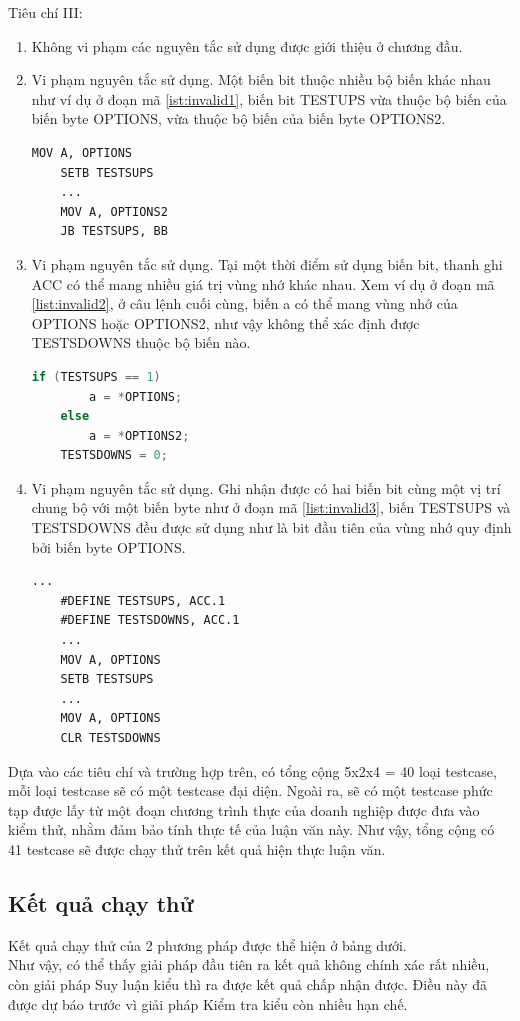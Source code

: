 Tiêu chí III:
\begin{enumerate}
	\item Không vi phạm các nguyên tắc sử dụng được giới thiệu ở chương đầu.
	\item Vi phạm nguyên tắc sử dụng. Một biến bit thuộc nhiều bộ biến khác nhau như ví dụ ở đoạn mã \ref{ist:invalid1}, biến bit TESTUPS vừa thuộc bộ biến của biến byte OPTIONS, vừa thuộc bộ biến của biến byte OPTIONS2.
	\begin{lstlisting}[caption={Đoạn mã có một biến bit thuộc nhiều bộ biến khác nhau},label={list:invalid1}]
	MOV A, OPTIONS
	SETB TESTSUPS
	...
	MOV A, OPTIONS2
	JB TESTSUPS, BB
	\end{lstlisting}
	\item Vi phạm nguyên tắc sử dụng. Tại một thời điểm sử dụng biến bit, thanh ghi ACC có thể mang nhiều giá trị vùng nhớ khác nhau. Xem ví dụ ở đoạn mã \ref{list:invalid2}, ở câu lệnh cuối cùng, biến a có thể mang vùng nhớ của OPTIONS hoặc OPTIONS2, như vậy không thể xác định được TESTSDOWNS thuộc bộ biến nào.
	\begin{lstlisting}[caption={Đoạn mã ACC có thể mang nhiều giá trị vùng nhớ khác nhau},label={list:invalid2}, language=c++]
	if (TESTSUPS == 1)
		a = *OPTIONS;
	else
		a = *OPTIONS2;
	TESTSDOWNS = 0;
	\end{lstlisting}
	\item Vi phạm nguyên tắc sử dụng. Ghi nhận được có hai biến bit cùng một vị trí chung bộ với một biến byte như ở đoạn mã \ref{list:invalid3}, biến TESTSUPS và TESTSDOWNS đều được sử dụng như là bit đầu tiên của vùng nhớ quy định bởi biến byte OPTIONS.
	\begin{lstlisting}[caption={Đoạn mã có 2 biến bit cùng một vị trí và đều được ghi nhận cùng bộ với một biến byte},label={list:invalid3}]
	...
	#DEFINE TESTSUPS, ACC.1
	#DEFINE TESTSDOWNS, ACC.1
	...
	MOV A, OPTIONS
	SETB TESTSUPS
	...
	MOV A, OPTIONS
	CLR TESTSDOWNS
	\end{lstlisting}
\end{enumerate}

Dựa vào các tiêu chí và trường hợp trên, có tổng cộng 5x2x4 = 40 loại testcase, mỗi loại testcase sẽ có một testcase đại diện. Ngoài ra, sẽ có một testcase phức tạp được lấy từ một đoạn chương trình thực của doanh nghiệp được đưa vào kiểm thử, nhằm đảm bảo tính thực tế của luận văn này. Như vậy, tổng cộng có 41 testcase sẽ được chạy thử trên kết quả hiện thực luận văn.\\

\subsection{Kết quả chạy thử}

Kết quả chạy thử của 2 phương pháp được thể hiện ở bảng dưới.\\


Như vậy, có thể thấy giải pháp đầu tiên ra kết quả không chính xác rất nhiều, còn giải pháp Suy luận kiểu thì ra được kết quả chấp nhận được. Điều này đã được dự báo trước vì giải pháp Kiểm tra kiểu còn nhiều hạn chế.\\

